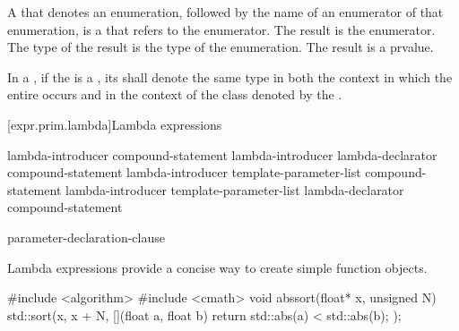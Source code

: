 \pnum
A  that denotes an
enumeration, followed by the name of an
enumerator of that enumeration, is a 
that refers to the enumerator. The result is the enumerator. The type
of the result is the type of the enumeration. The result is a prvalue.

\pnum
In a , if the
is a
, its 
shall denote the same type in both the context in which the entire
 occurs and in the context of the class denoted
by the .

[expr.prim.lambda]{Lambda expressions}%

\begin{bnf}
\br
    lambda-introducer compound-statement\br
    lambda-introducer lambda-declarator  compound-statement\br
    lambda-introducer \terminal{<} template-parameter-list \terminal{>}  compound-statement\br
    lambda-introducer \terminal{<} template-parameter-list \terminal{>} \br
    \hspace*{\bnfindentinc}lambda-declarator  compound-statement
\end{bnf}

\begin{bnf}
\br
    \terminal{[}  \terminal{]}
\end{bnf}

\begin{bnf}
\br
    \terminal{(} parameter-declaration-clause \terminal{)} \br
    \hspace*{\bnfindentinc}  
\end{bnf}

\pnum
Lambda expressions provide a concise way to create simple function objects.
\begin{example}
\begin{codeblock}
#include <algorithm>
#include <cmath>
void abssort(float* x, unsigned N) {
  std::sort(x, x + N, [](float a, float b) { return std::abs(a) < std::abs(b); });
}
\end{codeblock}
\end{example}

